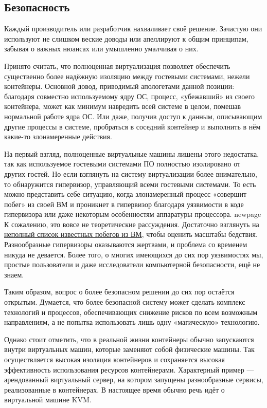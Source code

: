 \documentclass[14pt, a4paper]{article}
\begin{document}
\subsection*{Безопасность}

Каждый производитель или разработчик нахваливает своё решение. Зачастую они используют не
слишком веские доводы или апеллируют к общим принципам, забывая о важных нюансах или
умышленно умалчивая о них.

Принято считать, что полноценная виртуализация позволяет обеспечить существенно более
надёжную изоляцию между гостевыми системами, нежели контейнеры. Основной довод, приводимый
апологетами данной позиции: благодаря совместно используемому ядру ОС, процесс, «убежавший»
из своего контейнера, может как минимум навредить всей системе в целом, помешав нормальной
работе ядра ОС. Или даже, получив доступ к данным, описывающим другие процессы в системе,
пробраться в соседний контейнер и выполнить в нём какие-то злонамеренные действия.

На первый взгляд, полноценные виртуальные машины лишены этого недостатка, так как
используемое гостевыми системами ПО полностью изолировано от других гостей. Но если взглянуть
на систему виртуализации более внимательно, то обнаружится гипервизор, управляющий всеми
гостевыми системами. То есть можно представить себе ситуацию, когда злонамеренный процесс
«совершит побег» из своей ВМ и проникнет в гипервизор благодаря уязвимости в коде гипервизора
или даже некоторым особенностям аппаратуры процессора.
newpage
К сожалению, это вовсе не теоретические рассуждения. Достаточно взглянуть на \href{https://en.wikipedia.org/wiki/Virtual_machine_escape}{неполный список
известных побегов из ВМ}, чтобы оценить масштабы бедствия. Разнообразные гипервизоры
оказываются жертвами, и проблема со временем никуда не девается. Более того, о многих
имеющихся до сих пор уязвимостях мы, простые пользователи и даже исследователи компьютерной
безопасности, ещё не знаем.

Таким образом, вопрос о более безопасном решении до сих пор остаётся открытым. Думается, что
более безопасной систему может сделать комплекс технологий и процессов, обеспечивающих
снижение рисков по всем возможным направлениям, а не попытка использовать лишь одну
«магическую» технологию.

Однако стоит отметить, что в реальной жизни контейнеры обычно запускаются внутри виртуальных
машин, которые заменяют собой физические машины. Так осуществляется высокая изоляция
контейнеров и сохраняется высокая эффективность использования ресурсов контейнерами.
Характерный пример — арендованный виртуальный сервер, на котором запущены разнообразные
сервисы, реализованные в контейнерах. В настоящее время обычно речь идёт о виртуальной машине
KVM.\newpage
\end{document}
